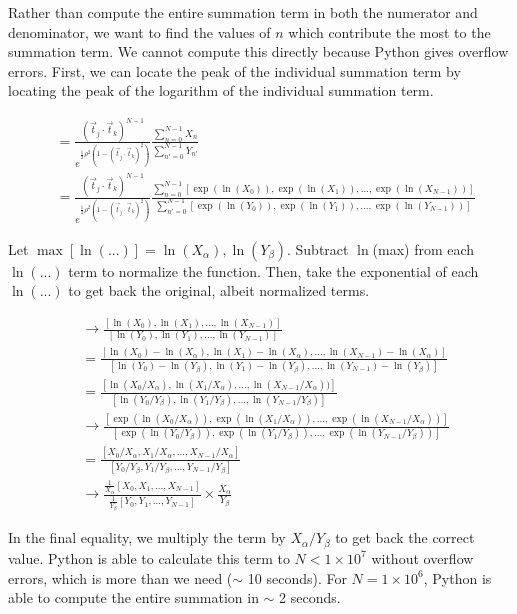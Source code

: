 \documentclass[12pt]{article}
\newcommand{\tjtk}{(\vec{t}_j\cdot\vec{t}_k)}
\begin{document}
Rather than compute the entire summation term in both the numerator and denominator, we want to find the values of $n$ which contribute the most to the summation term. We cannot compute this directly because Python gives overflow errors. First, we can locate the peak of the individual summation term by locating the peak of the logarithm of the individual summation term.

   \begin{align}
   &= \frac{\tjtk^{N-1}}{e^{\frac{1}{2}\rho^2(1-\tjtk^2)}} 
   \frac{ \sum_{n=0}^{N-1} X_n } 
   { \sum_{n'=0}^{N-1} Y_{n'} } \\
   &= \frac{\tjtk^{N-1}}{e^{\frac{1}{2}\rho^2(1-\tjtk^2)}} 
   \frac{ \sum_{n=0}^{N-1} [\exp(\ln(X_0)),\exp(\ln(X_1)),...,\exp(\ln(X_{N-1}))] } 
   { \sum_{n'=0}^{N-1} [\exp(\ln(Y_0)),\exp(\ln(Y_1)),...,\exp(\ln(Y_{N-1}))] }
   \end{align}

Let $\max[\ln(...)] = \ln(X_\alpha), \ln(Y_\beta)$. Subtract $\ln$(max) from each $\ln(...)$ term to normalize the function. Then, take the exponential of each $\ln(...)$ to get back the original, albeit normalized terms.

   \begin{align}
   &\rightarrow \frac{[\ln(X_0),\ln(X_1),...,\ln(X_{N-1})]}{[\ln(Y_0),\ln(Y_1),...,\ln(Y_{N-1})]} \\
   &= \frac{[\ln(X_0)-\ln(X_\alpha),\ln(X_1)-\ln(X_\alpha),...,\ln(X_{N-1})-\ln(X_\alpha)]}{[\ln(Y_0)-\ln(Y_\beta),\ln(Y_1)-\ln(Y_\beta),...,\ln(Y_{N-1})-\ln(Y_\beta)]} \\
   &= \frac{[\ln(X_0/X_\alpha),\ln(X_1/X_\alpha),...,\ln(X_{N-1}/X_\alpha))]}{[\ln(Y_0/Y_\beta),\ln(Y_1/Y_\beta),...,\ln(Y_{N-1}/Y_\beta)]} \\
   &\rightarrow \frac{[\exp(\ln(X_0/X_\alpha)),\exp(\ln(X_1/X_\alpha)),...,\exp(\ln(X_{N-1}/X_\alpha))]}{[\exp(\ln(Y_0/Y_\beta)),\exp(\ln(Y_1/Y_\beta)),...,\exp(\ln(Y_{N-1}/Y_\beta))]} \\
   &= \frac{[X_0/X_\alpha,X_1/X_\alpha,...,X_{N-1}/X_\alpha]}{[Y_0/Y_\beta,Y_1/Y_\beta,...,Y_{N-1}/Y_\beta]} \\
   &\rightarrow\frac{\frac{1}{X_\alpha}[X_0,X_1,...,X_{N-1}]}{\frac{1}{Y_\beta}[Y_0,Y_1,...,Y_{N-1}]} \times \frac{X_\alpha}{Y_\beta}
   \end{align}

In the final equality, we multiply the term by $X_\alpha/Y_\beta$ to get back the correct value. Python is able to calculate this term to $N < 1\times10^{7}$ without overflow errors, which is more than we need ($\sim$ 10 seconds). For $N = 1\times10^{6}$, Python is able to compute the entire summation in $\sim$ 2 seconds.
\end{document}
